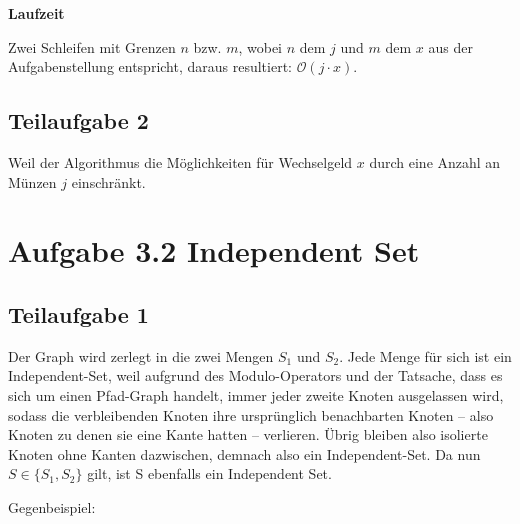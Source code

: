 \documentclass[a4paper, fontsize=10pt]{scrartcl}
\begin{document}
\textbf{Laufzeit}

Zwei Schleifen mit Grenzen $n$ bzw. $m$, wobei $n$ dem $j$ und $m$ dem $x$ aus der Aufgabenstellung entspricht, daraus resultiert: $\mathcal{O}(j\cdot x)$.

\subsection*{Teilaufgabe 2}
Weil der Algorithmus die Möglichkeiten für Wechselgeld $x$ durch eine Anzahl an Münzen $j$ einschränkt. 

\section*{Aufgabe 3.2 Independent Set}
\subsection*{Teilaufgabe 1}
Der Graph wird zerlegt in die zwei Mengen $S_1$ und $S_2$. Jede Menge für sich ist ein Independent-Set, weil aufgrund des Modulo-Operators und der Tatsache, dass es sich um einen Pfad-Graph handelt, immer jeder zweite Knoten ausgelassen wird, sodass die verbleibenden Knoten ihre ursprünglich benachbarten Knoten -- also Knoten zu denen sie eine Kante hatten -- verlieren. Übrig bleiben also isolierte Knoten ohne Kanten dazwischen, demnach also ein Independent-Set. Da nun $S\in \{S_1,S_2\}$ gilt, ist S ebenfalls ein Independent Set.\bigskip

Gegenbeispiel:\bigskip

\begin{center}
\end{center}
\bigskip
\end{document}
